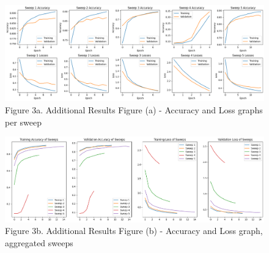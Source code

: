 \documentclass[acmtog]{acmart}
\begin{document}
	\begin{figure}[h]
		\centering
		\includegraphics[scale=0.4]{../src/images/FinalResults/Additional_Results_figure_a.png}\\
		Figure 3a. Additional Results Figure (a) - Accuracy and Loss graphs per sweep
		
		\vspace{2cm}
		
		\centering
		\includegraphics[scale=0.4]{../src/images/FinalResults/Additional_Results_figure_b.png}\\
		Figure 3b. Additional Results Figure (b) - Accuracy and Loss graph, aggregated sweeps
		
	\end{figure}
	
\end{document}
